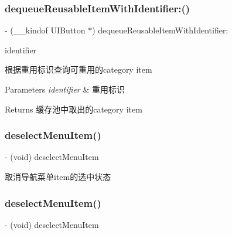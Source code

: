 \subsubsection{\texorpdfstring{dequeue\+Reusable\+Item\+With\+Identifier\+:()}{dequeueReusableItemWithIdentifier:()}\hspace{0.1cm}{\footnotesize\ttfamily [3/3]}}
{\footnotesize\ttfamily -\/ (\+\_\+\+\_\+kindof U\+I\+Button $\ast$) dequeue\+Reusable\+Item\+With\+Identifier\+: \begin{DoxyParamCaption}\item[{(N\+S\+String $\ast$)}]{identifier }\end{DoxyParamCaption}}

根据重用标识查询可重用的category item


\begin{DoxyParams}{Parameters}
{\em identifier} & 重用标识\\
\hline
\end{DoxyParams}
\begin{DoxyReturn}{Returns}
缓存池中取出的category item 
\end{DoxyReturn}
\mbox{\label{interface_v_t_menu_bar_a8539552ebb1885de47bad0ee12416c18}} 
\subsubsection{\texorpdfstring{deselect\+Menu\+Item()}{deselectMenuItem()}\hspace{0.1cm}{\footnotesize\ttfamily [1/3]}}
{\footnotesize\ttfamily -\/ (void) deselect\+Menu\+Item \begin{DoxyParamCaption}{ }\end{DoxyParamCaption}}

取消导航菜单item的选中状态 \mbox{\label{interface_v_t_menu_bar_a8539552ebb1885de47bad0ee12416c18}} 
\subsubsection{\texorpdfstring{deselect\+Menu\+Item()}{deselectMenuItem()}\hspace{0.1cm}{\footnotesize\ttfamily [2/3]}}
{\footnotesize\ttfamily -\/ (void) deselect\+Menu\+Item \begin{DoxyParamCaption}{ }\end{DoxyParamCaption}}

